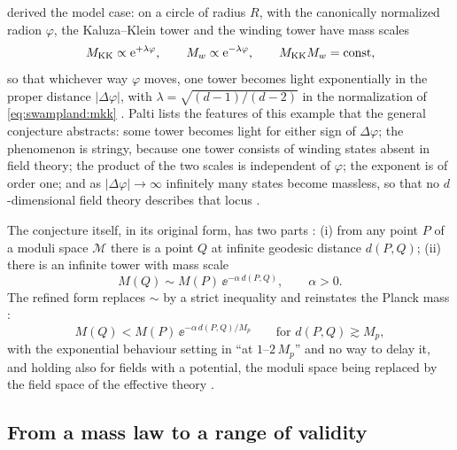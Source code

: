  derived the model case: on a circle of radius $R$, with the canonically
normalized radion $\varphi$, the Kaluza--Klein tower and the winding tower have mass scales
\begin{equation}\label{eq:triad:towers}
M_{\rm KK}\propto\mathrm{e}^{+\lambda\varphi},\qquad M_w\propto\mathrm{e}^{-\lambda\varphi},\qquad
M_{\rm KK}M_w=\text{const},
\end{equation}
so that whichever way $\varphi$ moves, one tower becomes light exponentially in the proper
distance $|\Delta\varphi|$, with $\lambda=\sqrt{(d-1)/(d-2)}$ in the normalization of
\eqref{eq:swampland:mkk} . Palti lists the features of this
example that the general conjecture abstracts: some tower becomes light for either sign of
$\Delta\varphi$; the phenomenon is stringy, because one tower consists of winding states absent
in field theory; the product of the two scales is independent of $\varphi$; the exponent is of
order one; and as $|\Delta\varphi|\to\infty$ infinitely many states become massless, so that no
$d$-dimensional field theory describes that locus .

The conjecture itself, in its original form, has two parts : (i) from any point $P$ of a moduli space $\mathcal M$ there is a point $Q$ at
infinite geodesic distance $d(P,Q)$; (ii) there is an infinite tower with mass scale
\begin{equation}\label{eq:triad:sdc}
M(Q)\sim M(P)\,\ee^{-\alpha\,d(P,Q)},\qquad\alpha>0 .
\end{equation}
The refined form replaces $\sim$ by a strict inequality and reinstates the Planck mass
:
\begin{equation}\label{eq:triad:rsdc}
M(Q)<M(P)\,\ee^{-\alpha\,d(P,Q)/M_p}\qquad\text{for }d(P,Q)\gtrsim M_p ,
\end{equation}
with the exponential behaviour setting in ``at $1$--$2\,M_p$'' and no way to delay it, and
holding also for fields with a potential, the moduli space being replaced by the field space
of the effective theory .

\subsection{From a mass law to a range of validity}

